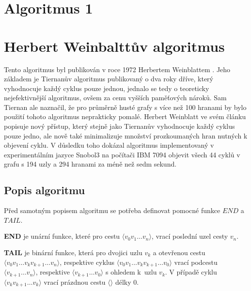\chapter{Algoritmus 1}
    \label{chapter:Algo1}
    \lipsum

\chapter{Herbert Weinbalttův algoritmus}
    \label{chapter:Algo2}
    Tento algoritmus byl publikován v roce 1972 Herbertem Weinblattem \cite{A_new_search_algorithm}. Jeho základem je Tiernanův algoritmus \cite{Tiernan} publikovaný o dva roky dříve, který vyhodnocuje každý cyklus pouze jednou, jednalo se tedy o teoreticky nejefektivnější algoritmus, ovšem za cenu vyšších paměťových nároků. Sam Tiernan ale naznačil, že pro průměrně husté grafy s více než 100 hranami by bylo použití tohoto algoritmus neprakticky pomalé. Herbert Weinblatt ve svém článku popisuje nový přístup, který stejně jako Tiernanův vyhodnocuje každý cyklus pouze jedno, ale nově také minimalizuje množství prozkoumaných hran nutných k objevení cyklu. V důsledku toho dokázal algoritmus implementovaný v experimentálním jazyce Snobol3 na počítači IBM 7094 objevit všech 44 cyklů v grafu s 194 uzly a 294 hranami za méně než sedm sekund.

    \section{Popis algoritmu}
        Před samotným popisem algoritmu se potřeba definovat pomocné funkce $\mathit{END}$ a $\mathit{TAIL}$.

        \begin{definition}
            \textbf{END} je unární funkce, které pro cestu $\langle v_0 v_1 \dots v_n \rangle$, vrací poslední uzel cesty $v_n$.
        \end{definition}

        \begin{definition}
            \textbf{TAIL} je binární funkce, která pro dvojici uzlu $v_k$ a otevřenou cestu $\langle v_0 v_1 \dots v_k v_{k+1} \dots v_n \rangle$, respektive cyklus $\langle v_0 v_1 \dots v_k v_{k+1} \dots v_0 \rangle$ vrací podcestu $\langle v_{k+1} \dots v_n \rangle$, respektive $\langle v_{k+1} \dots v_0 \rangle$ s ohledem k~uzlu $v_k$. V případě cyklu $\langle v_k v_{k+1} \dots v_k \rangle$ vrací prázdnou cestu $\langle \rangle$ délky 0.\\
        \end{definition}

